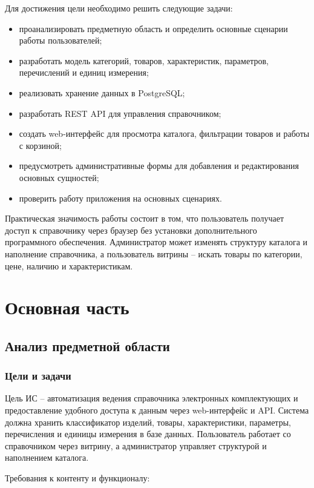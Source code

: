 \documentclass[a4paper,14pt]{extarticle}
\begin{document}
Для достижения цели необходимо решить следующие задачи:
\begin{itemize}
    \item проанализировать предметную область и определить основные сценарии работы пользователей;
    \item разработать модель категорий, товаров, характеристик, параметров, перечислений и единиц измерения;
    \item реализовать хранение данных в PostgreSQL;
    \item разработать REST API для управления справочником;
    \item создать web-интерфейс для просмотра каталога, фильтрации товаров и работы с корзиной;
    \item предусмотреть административные формы для добавления и редактирования основных сущностей;
    \item проверить работу приложения на основных сценариях.
\end{itemize}

Практическая значимость работы состоит в том, что пользователь получает доступ к справочнику через браузер без установки дополнительного программного обеспечения. Администратор может изменять структуру каталога и наполнение справочника, а пользователь витрины -- искать товары по категории, цене, наличию и характеристикам.

\section{Основная часть}

\subsection{Анализ предметной области}

\subsubsection{Цели и задачи}

Цель ИС -- автоматизация ведения справочника электронных комплектующих и предоставление удобного доступа к данным через web-интерфейс и API. Система должна хранить классификатор изделий, товары, характеристики, параметры, перечисления и единицы измерения в базе данных. Пользователь работает со справочником через витрину, а администратор управляет структурой и наполнением каталога.

Требования к контенту и функционалу:
\end{document}
